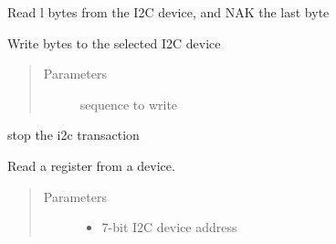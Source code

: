\begin{fulllineitems}

\begin{fulllineitems}
\label{\detokenize{index:i2cdriver.I2CDriver.read}}
Read l bytes from the I2C device, and NAK the last byte

\end{fulllineitems}


\begin{fulllineitems}
\label{\detokenize{index:i2cdriver.I2CDriver.write}}
Write bytes to the selected I2C device
\begin{quote}\begin{description}
\item[{Parameters}] \leavevmode
{} \textendash{} sequence to write

\end{description}\end{quote}

\end{fulllineitems}


\begin{fulllineitems}
\label{\detokenize{index:i2cdriver.I2CDriver.stop}}
stop the i2c transaction

\end{fulllineitems}


\begin{fulllineitems}
\label{\detokenize{index:i2cdriver.I2CDriver.regrd}}
Read a register from a device.
\begin{quote}\begin{description}
\item[{Parameters}] \leavevmode\begin{itemize}
\item {} 
 \textendash{} 7-bit I2C device address


\end{itemize}
\end{description}
\end{quote}
\end{fulllineitems}
\end{fulllineitems}
